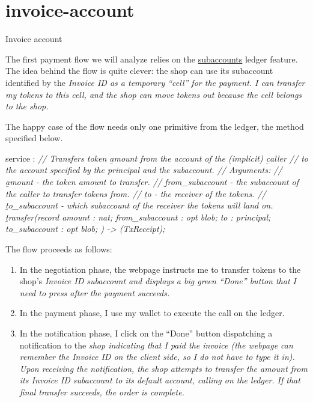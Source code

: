 \documentclass{article}
\begin{document}
\section{invoice-account}{Invoice account}

The first payment flow we will analyze relies on the \href{/posts/09-fungible-tokens-101.html#subaccounts}{subaccounts} ledger feature.
The idea behind the flow is quite clever: the shop can use its subaccount identified by the \em{Invoice ID} as a temporary ``cell'' for the payment.
I can transfer my tokens to this cell, and the shop can move tokens out because the cell belongs to the shop.

The happy case of the flow needs only one primitive from the ledger, the  method specified below.

\begin{code}[candid]
service : {
  \em{// Transfers token \b{amount} from the account of the (implicit) \b{caller}}
  \em{// to the account specified by the principal and the subaccount.}
  \em{// Arguments:}
  \em{//   \b{amount} - the token amount to transfer.}
  \em{//   \b{from_subaccount} - the subaccount of the caller to transfer tokens from.}
  \em{//   \b{to} - the receiver of the tokens.}
  \em{//   \b{to_subaccount} - which subaccount of the receiver the tokens will land on.}
  \b{transfer}(record {
    amount : nat;
    from_subaccount : opt blob;
    to : principal;
    to_subaccount : opt blob;
  }) -> (TxReceipt);
}
\end{code}

The flow proceeds as follows:
\begin{enumerate}
  \item 
    In the negotiation phase, the webpage instructs me to transfer tokens to the shop's \em{Invoice ID} subaccount and displays a big green ``Done'' button that I need to press after the payment succeeds.
  \item 
    In the payment phase, I use my wallet to execute the  call on the ledger.
  \item 
    In the notification phase, I click on the ``Done'' button dispatching a notification to the \em{shop} indicating that I paid the invoice (the webpage can remember the \em{Invoice ID} on the client side, so I do not have to type it in).
    Upon receiving the notification, the shop attempts to transfer the amount from its \em{Invoice ID} subaccount to its default account, calling  on the ledger.
    If that final transfer succeeds, the order is complete.
\end{enumerate}
\end{document}
